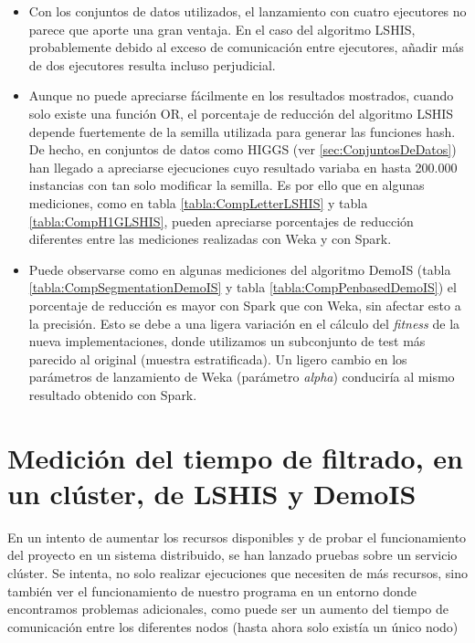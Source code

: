 \begin{itemize}
		\item Con los conjuntos de datos utilizados, el lanzamiento con cuatro ejecutores no parece que aporte una gran ventaja. En el caso del algoritmo LSHIS, probablemente debido al exceso de comunicación entre ejecutores, añadir más de dos ejecutores resulta incluso perjudicial. 
		
	\item Aunque no puede apreciarse fácilmente en los resultados mostrados, cuando solo existe una función OR, el porcentaje de reducción del algoritmo LSHIS depende fuertemente de la semilla utilizada para generar las funciones hash. De hecho, en conjuntos de datos como HIGGS (ver \ref{sec:ConjuntosDeDatos}) han llegado a apreciarse ejecuciones cuyo resultado variaba en hasta 200.000 instancias con tan solo modificar la semilla. Es por ello que en algunas mediciones, como en tabla \ref{tabla:CompLetterLSHIS} y tabla \ref{tabla:CompH1GLSHIS}, pueden apreciarse porcentajes de reducción diferentes entre las mediciones realizadas con Weka y con Spark. 
	
	\item Puede observarse como en algunas mediciones del algoritmo DemoIS (tabla \ref{tabla:CompSegmentationDemoIS} y tabla \ref{tabla:CompPenbasedDemoIS}) el porcentaje de reducción es mayor con Spark que con Weka, sin afectar esto a la precisión. Esto se debe a una ligera variación en el cálculo del \textit{fitness} de la nueva implementaciones, donde utilizamos un subconjunto de test más parecido al original (muestra estratificada). Un ligero cambio en los parámetros de lanzamiento de Weka (parámetro \textit{alpha}) conduciría al mismo resultado obtenido con Spark.
	
\end{itemize}


\section{Medición del tiempo de filtrado, en un clúster, de LSHIS y DemoIS}

En un intento de aumentar los recursos disponibles y de probar el funcionamiento del proyecto en un sistema distribuido, se han lanzado pruebas sobre un servicio clúster. Se intenta, no solo realizar ejecuciones  que necesiten de más recursos, sino también ver el funcionamiento de nuestro programa en un entorno donde encontramos problemas adicionales, como puede ser un aumento del tiempo de comunicación entre los diferentes nodos (hasta ahora solo existía un único nodo)

